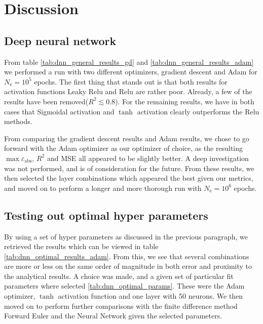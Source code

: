 \section{Discussion}
\subsection{Deep neural network}
From table \ref{tab:dnn_general_results_gd} and \ref{tab:dnn_general_results_adam} we performed a run with two different optimizers, gradient descent and Adam\cite{kingma_adam:_2014} for $N_\mathrm{e}=10^5$ epochs. The first thing that stands out is that both results for activation functions Leaky Relu and Relu are rather poor. Already, a few of the results have been removed($R^2\lesssim 0.8$). For the remaining results, we have in both cases that Sigmoidal activation and $\tanh$ activation clearly outperforms the Relu methods. 

From comparing the gradient descent results and Adam results, we chose to go forward with the Adam optimizer as our optimizer of choice, as the resulting $\max{\varepsilon_\mathrm{abs}}$, $R^2$ and MSE all appeared to be slightly better. A deep investigation was not performed, and is of consideration for the future. From these results, we then selected the layer combinations which appeared the best given our metrics, and moved on to perform a longer and more thorough run with $N_\mathrm{e}=10^6$ epochs.

\subsection{Testing out optimal hyper parameters}
By using a set of hyper parameters as discussed in the previous paragraph, we retrieved the results which can be viewed in table \ref{tab:dnn_optimal_results_adam}. From this, we see that several combinations are more or less on the same order of magnitude in both error and proximity to the analytical results. A choice was made, and a given set of particular fit parameters where selected \ref{tab:dnn_optimal_params}. These were the Adam optimizer, $\tanh$ activation function and one layer with 50 neurons. We then moved on to perform further comparisons with the finite difference method Forward Euler and the Neural Network given the selected parameters.

